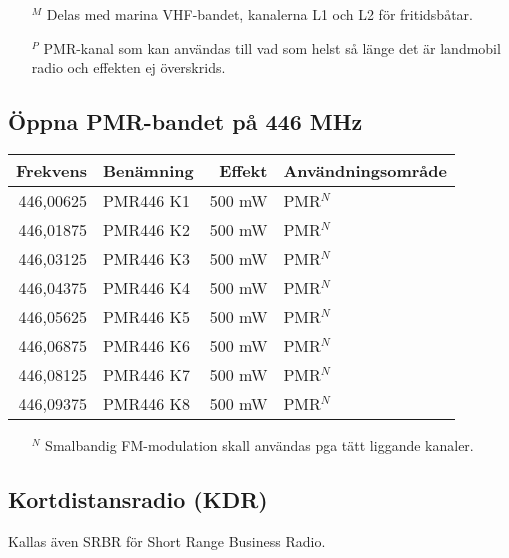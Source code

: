 \footnotesize
\begin{itemize}
	\item[$^M$] Delas med marina VHF-bandet, kanalerna L1 och L2 för fritidsbåtar.
	\item[$^P$] PMR-kanal som kan användas till vad som helst så länge det är landmobil radio och effekten ej överskrids.
\end{itemize}
\normalsize

\subsection{Öppna PMR-bandet på 446 MHz}
\begin{tabular}{rlrl}
	\textbf{Frekvens} & \textbf{Benämning} & \textbf{Effekt} & \textbf{Användningsområde} \\ \hline
	        446,00625 & PMR446 K1          &          500 mW & PMR$^N$                     \\
	        446,01875 & PMR446 K2          &          500 mW & PMR$^N$                     \\
	        446,03125 & PMR446 K3          &          500 mW & PMR$^N$                 \\
	        446,04375 & PMR446 K4          &          500 mW & PMR$^N$                     \\
	        446,05625 & PMR446 K5          &          500 mW & PMR$^N$                     \\
	        446,06875 & PMR446 K6          &          500 mW & PMR$^N$                    \\
	        446,08125 & PMR446 K7          &          500 mW & PMR$^N$                     \\
	        446,09375 & PMR446 K8          &          500 mW & PMR$^N$ 
\end{tabular}

\footnotesize
\begin{itemize}
	\item[$^N$] Smalbandig FM-modulation skall användas pga tätt liggande kanaler.
\end{itemize}
\normalsize

\subsection{Kortdistansradio (KDR)}

Kallas även SRBR för Short Range Business Radio.

